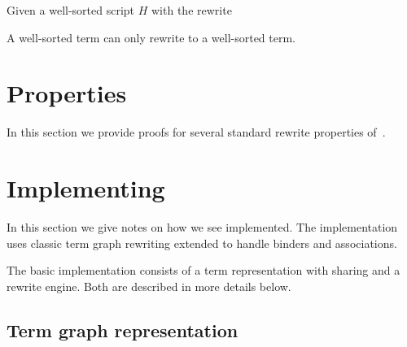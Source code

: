\documentclass[letterpaper,11pt]{article}
\begin{document}

\begin{theorem}
  Given a well-sorted \hax script $H$ with the rewrite 


A well-sorted term can only rewrite to a well-sorted term.
\end{theorem}


\section{Properties}
\label{sec:properties}

In this section we provide proofs for several standard rewrite properties of~\hax.




\section{Implementing \hax}
\label{sec:implement}

In this section we give notes on how we see \hax implemented. The implementation uses classic term
graph rewriting extended to handle binders and associations.

The basic \hax implementation consists of a term representation with sharing and a rewrite engine. Both are described
in more details below.     


\subsection{Term graph representation}
\end{document}
